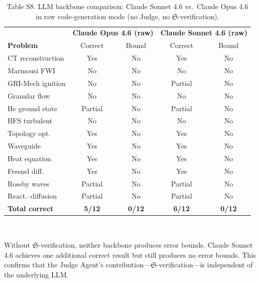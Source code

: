 \documentclass[11pt,a4paper]{article}
\newcommand{\Sclass}{\mathfrak{S}}
\begin{document}
\begin{table}[htbp]
\centering
\caption{Table S8. LLM backbone comparison: Claude Sonnet 4.6 vs.\ Claude Opus 4.6 in raw code-generation mode (no Judge, no $\Sclass$-verification).}
\small
\begin{tabularx}{\textwidth}{Xcc|cc}
\toprule
& \multicolumn{2}{c|}{\textbf{Claude Opus 4.6 (raw)}} & \multicolumn{2}{c}{\textbf{Claude Sonnet 4.6 (raw)}} \\
\textbf{Problem} & Correct & Bound & Correct & Bound \\
\midrule
CT reconstruction & Yes & No & Yes & No \\
Marmousi FWI & No & No & No & No \\
GRI-Mech ignition & No & No & Partial & No \\
Granular flow & No & No & No & No \\
He ground state & Partial & No & Partial & No \\
BFS turbulent & No & No & No & No \\
Topology opt. & Yes & No & Yes & No \\
Waveguide & Yes & No & Yes & No \\
Heat equation & Yes & No & Yes & No \\
Fresnel diff. & Yes & No & Yes & No \\
Rossby waves & Partial & No & Partial & No \\
React.--diffusion & Partial & No & Partial & No \\
\midrule
\textbf{Total correct} & \textbf{5/12} & \textbf{0/12} & \textbf{6/12} & \textbf{0/12} \\
\bottomrule
\end{tabularx}\\[3pt]
\raggedright\scriptsize Without $\Sclass$-verification, neither backbone produces error bounds. Claude Sonnet 4.6 achieves one additional correct result but still produces no error bounds. This confirms that the Judge Agent's contribution---$\Sclass$-verification---is independent of the underlying LLM.
\end{table}
\end{document}
